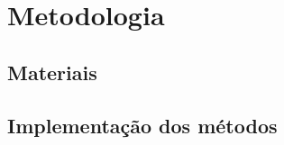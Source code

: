 



\chapter{Metodologia}\label{cap:metodologia}

\section{Materiais}






\section{Implementação dos métodos}



